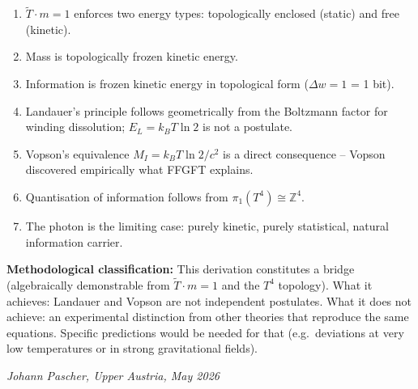 \begin{enumerate}
  \item \(\tilde{T} \cdot m = 1\) enforces two energy types:
        topologically enclosed (static) and free (kinetic).
  \item Mass is topologically frozen kinetic energy.
  \item Information is frozen kinetic energy in topological form
        (\(\Delta w = 1\) = 1 bit).
  \item Landauer's principle follows geometrically from the
        Boltzmann factor for winding dissolution;
        \(E_L = k_BT\ln 2\) is not a postulate.
  \item Vopson's equivalence \(M_I = k_BT\ln2/c^2\) is a direct
        consequence -- Vopson discovered empirically what FFGFT explains.
  \item Quantisation of information follows from
        \(\pi_1(T^4)\cong\mathbb{Z}^4\).
  \item The photon is the limiting case: purely kinetic, purely
        statistical, natural information carrier.
\end{enumerate}

\bigskip
\noindent
\textbf{Methodological classification:}
This derivation constitutes a bridge (algebraically demonstrable
from \(\tilde{T}\cdot m=1\) and the \(T^4\) topology).
What it achieves: Landauer and Vopson are not independent postulates.
What it does not achieve: an experimental distinction from other theories
that reproduce the same equations.
Specific predictions would be needed for that (e.g.\ deviations at
very low temperatures or in strong gravitational fields).

\bigskip
\begin{flushright}
\textit{Johann Pascher, Upper Austria, May 2026}
\end{flushright}

